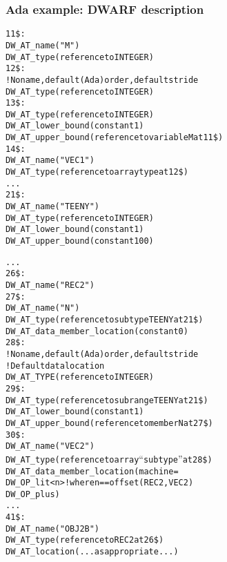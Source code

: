 \subsubsection{Ada example: DWARF description}
\label{app:adaexampledwarfdescription}

\begin{alltt}
11\$: 
        DW\-\_AT\-\_name("M")
        DW\-\_AT\-\_type(reference to INTEGER)
12\$: 
        ! No name, default (Ada) order, default stride
        DW\-\_AT\-\_type(reference to INTEGER)
13\$:    
            DW\-\_AT\-\_type(reference to INTEGER)
            DW\-\_AT\-\_lower\-\_bound(constant 1)
            DW\-\_AT\-\_upper\-\_bound(reference to variable M at 11\$)
14\$: 
        DW\-\_AT\-\_name("VEC1")
        DW\-\_AT\-\_type(reference to array type at 12\$)
    . . .
21\$: 
        DW\-\_AT\-\_name("TEENY")
        DW\-\_AT\-\_type(reference to INTEGER)
        DW\-\_AT\-\_lower\-\_bound(constant 1)
        DW\-\_AT\-\_upper\-\_bound(constant 100)

      . . .
26\$: 
        DW\-\_AT\-\_name("REC2")
27\$:   
            DW\-\_AT\-\_name("N")
            DW\-\_AT\-\_type(reference to subtype TEENY at 21\$)
            DW\-\_AT\-\_data\-\_member\-\_location(constant 0)
28\$:   
            ! No name, default (Ada) order, default stride
            ! Default data location
            DW\-\_AT\-\_TYPE(reference to INTEGER)
29\$:       
                DW\-\_AT\-\_type(reference to subrange TEENY at 21\$)
                DW\-\_AT\-\_lower\-\_bound(constant 1)
                DW\-\_AT\-\_upper\-\_bound(reference to member N at 27\$)
30\$:   
            DW\-\_AT\-\_name("VEC2")
            DW\-\_AT\-\_type(reference to array “subtype” at 28\$)
            DW\-\_AT\-\_data\-\_member\-\_location(machine=
                DW\-\_OP\-\_lit<n> ! where n == offset(REC2, VEC2)
                DW\-\_OP\-\_plus)
      . . .
41\$: 
        DW\-\_AT\-\_name("OBJ2B")
        DW\-\_AT\-\_type(reference to REC2 at 26\$)
        DW\-\_AT\-\_location(...as appropriate...)

\end{alltt}


